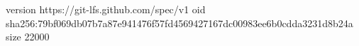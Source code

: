 version https://git-lfs.github.com/spec/v1
oid sha256:79bf069db07b7a87e941476f57fd4569427167dc00983ee6b0cdda3231d8b24a
size 22000
